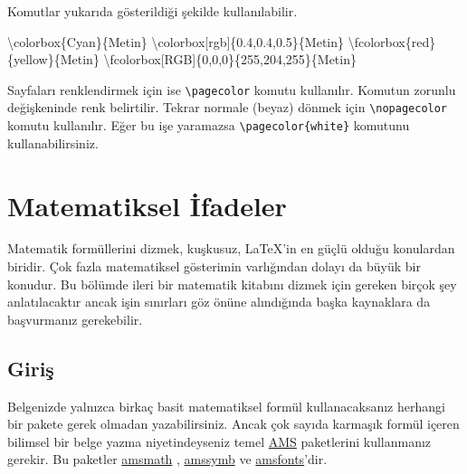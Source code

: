 \documentclass[
  letterpaper,
  DIV=11,
  numbers=noendperiod]{scrreprt}
\newenvironment{Shaded}{\begin{snugshade}}{\end{snugshade}}
\newcommand{\FunctionTok}[1]{\textcolor[rgb]{0.28,0.35,0.67}{#1}}
\newcommand{\NormalTok}[1]{\textcolor[rgb]{0.00,0.23,0.31}{#1}}
\begin{document}
Komutlar yukarıda gösterildiği şekilde kullanılabilir.

\begin{Shaded}
\begin{Highlighting}[]
\FunctionTok{\textbackslash{}colorbox}\NormalTok{\{Cyan\}\{Metin\}}
\FunctionTok{\textbackslash{}colorbox}\NormalTok{[rgb]\{0.4,0.4,0.5\}\{Metin\}}
\FunctionTok{\textbackslash{}fcolorbox}\NormalTok{\{red\}\{yellow\}\{Metin\}}
\FunctionTok{\textbackslash{}fcolorbox}\NormalTok{[RGB]\{0,0,0\}\{255,204,255\}\{Metin\}}
\end{Highlighting}
\end{Shaded}

Sayfaları renklendirmek için ise \texttt{\textbackslash{}pagecolor}
komutu kullanılır. Komutun zorunlu değişkeninde renk belirtilir. Tekrar
normale (beyaz) dönmek için \texttt{\textbackslash{}nopagecolor} komutu
kullanılır. Eğer bu işe yaramazsa
\texttt{\textbackslash{}pagecolor\{white\}} komutunu kullanabilirsiniz.


\hypertarget{matematiksel-ifadeler}{%
\chapter{Matematiksel İfadeler}\label{matematiksel-ifadeler}}

Matematik formüllerini dizmek, kuşkusuz, {\LaTeX}'in en güçlü olduğu
konulardan biridir. Çok fazla matematiksel gösterimin varlığından dolayı
da büyük bir konudur. Bu bölümde ileri bir matematik kitabını dizmek
için gereken birçok şey anlatılacaktır ancak işin sınırları göz önüne
alındığında başka kaynaklara da başvurmanız gerekebilir.

\hypertarget{giriux15f-1}{%
\section{Giriş}\label{giriux15f-1}}

Belgenizde yalnızca birkaç basit matematiksel formül kullanacaksanız
herhangi bir pakete gerek olmadan yazabilirsiniz. Ancak çok sayıda
karmaşık formül içeren bilimsel bir belge yazma niyetindeyseniz temel
\href{https://www.ams.org/publications/authors/tex/amslatex}{AMS}
paketlerini kullanmanız gerekir. Bu paketler
\href{http://ftp.ntua.gr/mirror/ctan/macros/latex/required/amsmath/amsmath.pdf}{amsmath}
,
\href{https://texdoc.net/texmf-dist/doc/fonts/amsfonts/amssymb.pdf}{amssymb}
ve
\href{http://ftp.ntua.gr/mirror/ctan/fonts/amsfonts/doc/amsfonts.pdf}{amsfonts}'dir.
\end{document}
